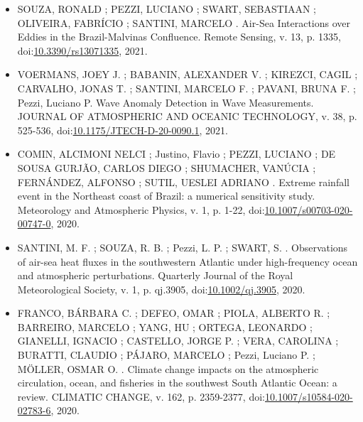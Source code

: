 \documentclass[11pt, a4paper]{awesome-cv}
\begin{document}
\makecvheader[R]

\makelettertitle

\begin{cvletter}
\vspace{-2cm}
\begin{itemize}
  \item[] SOUZA, RONALD ; PEZZI, LUCIANO ; SWART, SEBASTIAAN ; OLIVEIRA, FABRÍCIO ; SANTINI, MARCELO .
  Air-Sea Interactions over Eddies in the Brazil-Malvinas Confluence. Remote Sensing, v. 13, p. 1335,
  doi:\textcolor{bleu_cite}{\href{https://doi.org/10.3390/rs13071335}{10.3390/rs13071335}}, 2021.

  \item[] VOERMANS, JOEY J. ; BABANIN, ALEXANDER V. ; KIREZCI, CAGIL ; CARVALHO, JONAS T. ; SANTINI, MARCELO F. ; PAVANI, BRUNA F. ; Pezzi, Luciano P.  
  Wave Anomaly Detection in Wave Measurements. JOURNAL OF ATMOSPHERIC AND OCEANIC TECHNOLOGY, v. 38, p. 525-536, 
  doi:\textcolor{bleu_cite}{\href{https://doi.org/10.1175/JTECH-D-20-0090.1}{10.1175/JTECH-D-20-0090.1}}, 2021.
 
  \item[] COMIN, ALCIMONI NELCI ; Justino, Flavio ; PEZZI, LUCIANO ; DE SOUSA GURJÃO, CARLOS DIEGO ; SHUMACHER, VANÚCIA ; FERNÁNDEZ, ALFONSO ; SUTIL, UESLEI ADRIANO . 
  Extreme rainfall event in the Northeast coast of Brazil: a numerical sensitivity study. Meteorology and Atmospheric Physics, v. 1, p. 1-22,  
  doi:\textcolor{bleu_cite}{\href{https://doi.org/10.1007/s00703-020-00747-0}{10.1007/s00703-020-00747-0}}, 2020.

  \item[] SANTINI, M. F. ; SOUZA, R. B. ; Pezzi, L. P. ; SWART, S. . Observations of air-sea heat 
  fluxes in the southwestern Atlantic under high-frequency ocean and atmospheric perturbations. Quarterly Journal of the Royal Meteorological Society, v. 1, p. qj.3905, 
  doi:\textcolor{bleu_cite}{\href{https://doi.org/10.1002/qj.3905}{10.1002/qj.3905}}, 2020.

  \item[] FRANCO, BÁRBARA C. ; DEFEO, OMAR ; PIOLA, ALBERTO R. ; BARREIRO, MARCELO ; YANG, HU ; ORTEGA, LEONARDO ; GIANELLI, IGNACIO ; CASTELLO, JORGE P. ; VERA, CAROLINA ; BURATTI, CLAUDIO ; PÁJARO, MARCELO ; Pezzi, Luciano P. ; MÖLLER, OSMAR O. . 
  Climate change impacts on the atmospheric circulation, ocean, and fisheries in the southwest South Atlantic Ocean: a review. CLIMATIC CHANGE, v. 162, p. 2359-2377, 
  doi:\textcolor{bleu_cite}{\href{https://doi.org/10.1007/s10584-020-02783-6}{10.1007/s10584-020-02783-6}}, 2020.


\end{itemize}
\end{cvletter}
\end{document}
